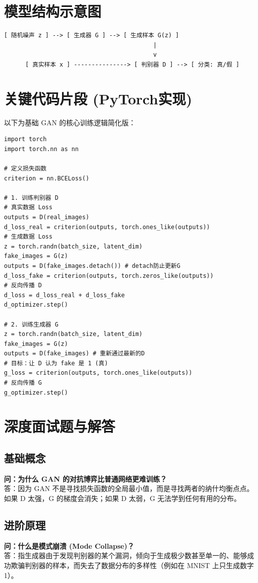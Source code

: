 \documentclass[12pt, a4paper]{article}
\begin{document}
\section{模型结构示意图}
\begin{verbatim}
[ 随机噪声 z ] --> [ 生成器 G ] --> [ 生成样本 G(z) ] 
                                          |
                                          v
      [ 真实样本 x ] ---------------> [ 判别器 D ] --> [ 分类: 真/假 ]
\end{verbatim}

\section{关键代码片段 (PyTorch实现)}
以下为基础 GAN 的核心训练逻辑简化版：
\begin{lstlisting}
import torch
import torch.nn as nn

# 定义损失函数
criterion = nn.BCELoss()

# 1. 训练判别器 D
# 真实数据 Loss
outputs = D(real_images)
d_loss_real = criterion(outputs, torch.ones_like(outputs))
# 生成数据 Loss
z = torch.randn(batch_size, latent_dim)
fake_images = G(z)
outputs = D(fake_images.detach()) # detach防止更新G
d_loss_fake = criterion(outputs, torch.zeros_like(outputs))
# 反向传播 D
d_loss = d_loss_real + d_loss_fake
d_optimizer.step()

# 2. 训练生成器 G
z = torch.randn(batch_size, latent_dim)
fake_images = G(z)
outputs = D(fake_images) # 重新通过最新的D
# 目标：让 D 认为 fake 是 1 (真)
g_loss = criterion(outputs, torch.ones_like(outputs))
# 反向传播 G
g_optimizer.step()
\end{lstlisting}

\section{深度面试题与解答}
\subsection{基础概念}
\textbf{问：为什么 GAN 的对抗博弈比普通网络更难训练？}\\
答：因为 GAN 不是寻找损失函数的全局最小值，而是寻找两者的纳什均衡点点。如果 D 太强，G 的梯度会消失；如果 D 太弱，G 无法学到任何有用的分布。

\subsection{进阶原理}
\textbf{问：什么是模式崩溃 (Mode Collapse)？}\\
答：指生成器由于发现判别器的某个漏洞，倾向于生成极少数甚至单一的、能够成功欺骗判别器的样本，而失去了数据分布的多样性（例如在 MNIST 上只生成数字 1）。
\end{document}
